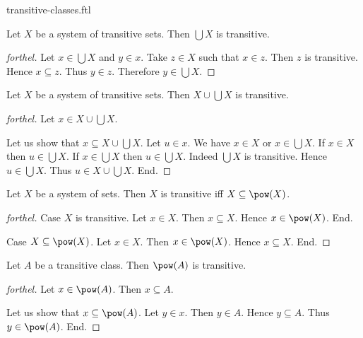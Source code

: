 \documentclass{naproche-library}
\begin{document}
\begin{smodule}[title=Transitive Classes]{transitive-classes.ftl}
\begin{proposition}[forthel,id=SET_THEORY_01_6726468811882496]
  Let $X$ be a system of transitive sets.
  Then $\bigcup X$ is transitive.
\end{proposition}
\begin{proof}[forthel]
  Let $x \in \bigcup X$ and $y \in x$.
  Take $z \in X$ such that $x \in z$.
  Then $z$ is transitive.
  Hence $x \subseteq z$.
  Thus $y \in z$.
  Therefore $y \in \bigcup X$.
\end{proof}

\begin{proposition}[forthel,id=SET_THEORY_01_4884401668227072]
  Let $X$ be a system of transitive sets.
  Then $X \cup \bigcup X$ is transitive.
\end{proposition}
\begin{proof}[forthel]
  Let $x \in X \cup \bigcup X$.

  Let us show that $x \subseteq X \cup \bigcup X$.
    Let $u \in x$.
    We have $x \in X$ or $x \in \bigcup X$.
    If $x \in X$then $u \in \bigcup X$.
    If $x \in \bigcup X$ then $u \in \bigcup X$.
    Indeed $\bigcup X$ is transitive.
    Hence $u \in \bigcup X$.
    Thus $u \in X \cup \bigcup X$.
  End.
\end{proof}

\begin{proposition}[forthel,id=SET_THEORY_01_1399002962591744]
  Let $X$ be a system of sets.
  Then $X$ is transitive iff $X \subseteq \pow(X)$.
\end{proposition}
\begin{proof}[forthel]
  Case $X$ is transitive.
    Let $x \in X$.
    Then $x \subseteq X$.
    Hence $x \in \pow(X)$.
  End.

  Case $X \subseteq \pow(X)$.
    Let $x \in X$.
    Then $x \in \pow(X)$.
    Hence $x \subseteq X$.
  End.
\end{proof}

\begin{proposition}[forthel,id=SET_THEORY_01_6995689103949824]
  Let $A$ be a transitive class.
  Then $\pow(A)$ is transitive.
\end{proposition}
\begin{proof}[forthel]
  Let $x \in \pow(A)$.
  Then $x \subseteq A$.

  Let us show that $x \subseteq \pow(A)$.
    Let $y \in x$.
    Then $y \in A$.
    Hence $y \subseteq A$.
    Thus $y \in \pow(A)$.
  End.
\end{proof}
\end{smodule}
\end{document}
